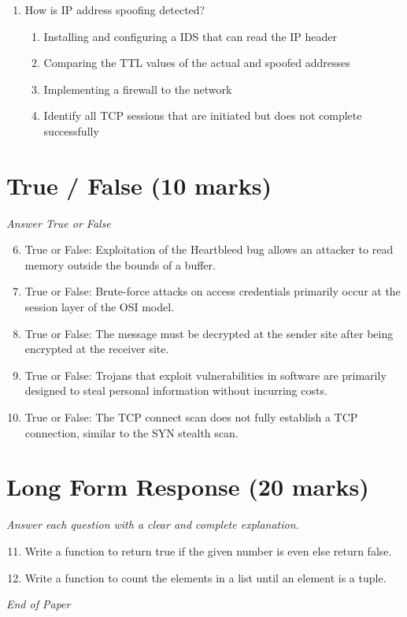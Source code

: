 \documentclass[12pt]{article}
\begin{document}
\begin{enumerate}[label=\arabic*.]
\begin{enumerate}[label=(\alph*)]
    \item crypter
    \item virus
    \item backdoor
    \item key-logger
\end{enumerate}
\item How is IP address spoofing detected?
\begin{enumerate}[label=(\alph*)]
    \item Installing and configuring a IDS that can read the IP header
    \item Comparing the TTL values of the actual and spoofed addresses
    \item Implementing a firewall to the network
    \item Identify all TCP sessions that are initiated but does not complete successfully
\end{enumerate}
\end{enumerate}

\section*{True / False (10 marks)}
\textit{Answer True or False}
\begin{enumerate}[label=\arabic*.]
\setcounter{enumi}{5}
\item True or False: Exploitation of the Heartbleed bug allows an attacker to read memory outside the bounds of a buffer.
\item True or False: Brute-force attacks on access credentials primarily occur at the session layer of the OSI model.
\item True or False: The message must be decrypted at the sender site after being encrypted at the receiver site.
\item True or False: Trojans that exploit vulnerabilities in software are primarily designed to steal personal information without incurring costs.
\item True or False: The TCP connect scan does not fully establish a TCP connection, similar to the SYN stealth scan.
\end{enumerate}

\section*{Long Form Response (20 marks)}
\textit{Answer each question with a clear and complete explanation.}
\begin{enumerate}[label=\arabic*.]
\setcounter{enumi}{10}
\item Write a function to return true if the given number is even else return false.
\item Write a function to count the elements in a list until an element is a tuple.
\end{enumerate}

\vfill
\noindent\textit{End of Paper}
\end{document}
